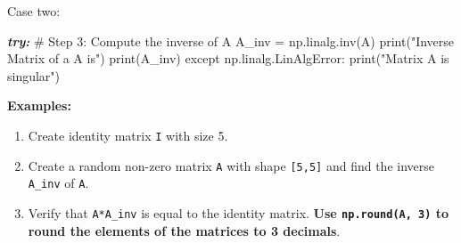 \documentclass[11pt]{article}
\newenvironment{Shaded}{}{}
\newcommand{\NormalTok}[1]{{#1}}
\newcommand{\AnnotationTok}[1]{\textcolor[rgb]{0.38,0.63,0.69}{\textbf{\textit{{#1}}}}}
\begin{document}
Case two:

\begin{Shaded}
\begin{Highlighting}[]
\AnnotationTok{try:}
\NormalTok{ \# Step 3: Compute the inverse of A}
\NormalTok{ A\_inv = np.linalg.inv(A)}
\NormalTok{ print("Inverse Matrix of a A is")}
\NormalTok{ print(A\_inv)}
\NormalTok{except np.linalg.LinAlgError:}
\NormalTok{   print("Matrix A is singular")}
\end{Highlighting}
\end{Shaded}

\newpage

\textbf{Examples:}

\begin{enumerate}
\def\labelenumi{\arabic{enumi}.}
\item
  Create identity matrix \texttt{I} with size 5.
\item
  Create a random non-zero matrix \texttt{A} with shape
  \texttt{{[}5,5{]}} and find the inverse \texttt{A\_inv} of \texttt{A}.
\item
  Verify that \texttt{A*A\_inv} is equal to the identity matrix.
  \textbf{Use \texttt{np.round(A,\ 3)} to round the elements of the
  matrices to 3 decimals}.
\end{enumerate}
\end{document}
